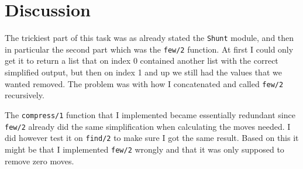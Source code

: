 \documentclass[a4paper,11pt]{article}
\begin{document}
\section*{Discussion}
The trickiest part of this task was as already stated the {\tt Shunt} module, and then in particular the second 
part which was the {\tt few/2} function. At first I could only get it to return a list that on index 0 contained 
another list with the correct simplified output, but then on index 1 and up we still had the values that we 
wanted removed. The problem was with how I concatenated and called {\tt few/2} recursively. 

The {\tt compress/1} function that I implemented became essentially redundant since {\tt few/2} already did the
same simplification when calculating the moves needed. I did however test it on {\tt find/2} to make sure I got 
the same result. Based on this it might be that I implemented {\tt few/2} wrongly and that it was only supposed 
to remove zero moves.
\end{document}
